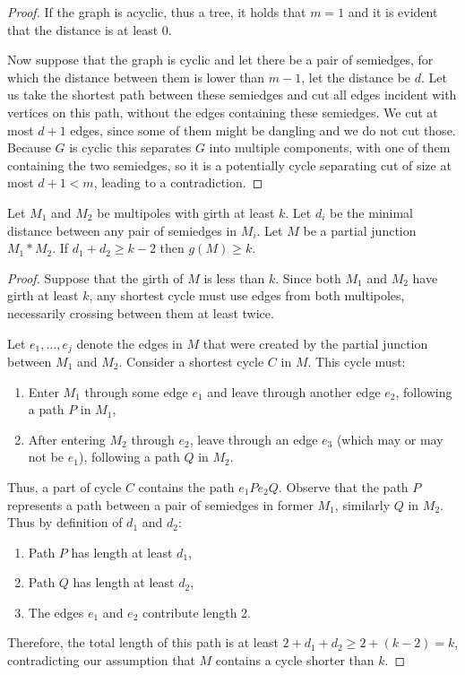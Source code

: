 \documentclass[12pt, twoside]{book}
\begin{document}
\begin{proof}
	If the graph is acyclic, thus a tree, it holds that $m=1$ and it is evident that the distance is at least 0.
	
	Now suppose that the graph is cyclic and let there be a pair of semiedges, for which the distance between them is lower than $m-1$, let the distance be $d$. Let us take the shortest path between these semiedges and cut all edges incident with vertices on this path, without  the edges containing these semiedges. We cut at most $d+1$ edges, since some of them might be dangling and we do not cut those. Because $G$ is cyclic this separates $G$ into multiple components, with one of them containing the two semiedges, so it is a potentially cycle separating cut of size at most $d+1<m$, leading to a contradiction.
\end{proof}

\begin{lemma}\label{lem:cyclic-multipoles-with-girth-and-distance}
	Let $M_1$ and $M_2$ be multipoles with girth at least $k$. Let $d_i$ be the minimal distance between any pair of semiedges in $M_i$. Let $M$ be a partial junction $M_1*M_2$. If $d_1+d_2\geq k-2$ then $g(M)\geq k$.
\end{lemma}

\begin{proof}
	Suppose that the girth of $M$ is less than $k$. Since both $M_1$ and $M_2$ have girth at least $k$, any shortest cycle must use edges from both multipoles, necessarily crossing between them at least twice.
	
	Let $e_1,\dots,e_j$ denote the edges in $M$ that were created by the partial junction between $M_1$ and $M_2$. Consider a shortest cycle $C$ in $M$. This cycle must:
	
	\begin{enumerate}
		\item Enter $M_1$ through some edge $e_1$ and leave through another edge $e_2$, following a path $P$ in $M_1$,
		\item After entering $M_2$ through $e_2$, leave through an edge $e_3$ (which may or may not be $e_1$), following a path $Q$ in $M_2$.
	\end{enumerate}

	Thus, a part of cycle $C$ contains the path $e_1Pe_2Q$. Observe that the path $P$ represents a path between a pair of semiedges in former $M_1$, similarly $Q$ in $M_2$. Thus by definition of $d_1$ and $d_2$:
	
	\begin{enumerate}
		\item Path $P$ has length at least $d_1$,
		\item Path $Q$ has length at least $d_2$,
		\item The edges $e_1$ and $e_2$ contribute length 2.
	\end{enumerate}

	Therefore, the total length of this path is at least $2+d_1+d_2 \geq 2+(k-2) = k$, contradicting our assumption that $M$ contains a cycle shorter than $k$.
\end{proof}
\end{document}
